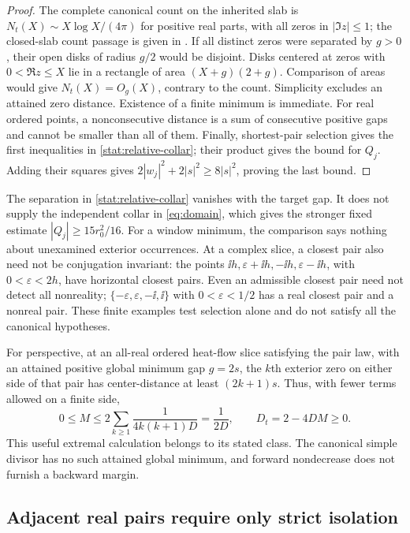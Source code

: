 \begin{proof}
The complete canonical count on the inherited slab is
$N_t(X)\sim X\log X/(4\pi)$ for positive real parts, with all zeros in
$|\Im z|\le1$; the closed-slab count passage is given in
\cite{BakerGT33}. If all distinct zeros were separated by $g>0$, their
open disks of radius $g/2$ would be disjoint. Disks centered at zeros with
$0<\Re z\le X$ lie in a rectangle of area
$(X+g)(2+g)$. Comparison of areas would give $N_t(X)=O_g(X)$,
contrary to the count. Simplicity excludes an attained zero distance.
Existence of a finite minimum is immediate. For real ordered points,
a nonconsecutive distance is a sum of consecutive positive gaps and
cannot be smaller than all of them. Finally, shortest-pair selection
gives the first inequalities in \eqref{stat:relative-collar}; their
product gives the bound for $Q_j$. Adding their squares gives
$2|w_j|^2+2|s|^2\ge8|s|^2$, proving the last bound.
\end{proof}

The separation in \eqref{stat:relative-collar} vanishes with the target
gap. It does not supply the independent collar in \eqref{eq:domain},
which gives the stronger fixed estimate $|Q_j|\ge15r_0^2/16$.
For a window minimum, the comparison says nothing about unexamined
exterior occurrences. At a complex slice, a closest pair also need not be
conjugation invariant: the points $\ii h,\varepsilon+\ii h,-\ii h,
\varepsilon-\ii h$, with $0<\varepsilon<2h$, have horizontal closest
pairs. Even an admissible closest pair need not detect all nonreality;
$\{-\varepsilon,\varepsilon,-\ii,\ii\}$ with
$0<\varepsilon<1/2$ has a real closest pair and a nonreal pair.
These finite examples test selection alone and do not satisfy all the
canonical hypotheses.

For perspective, at an all-real ordered heat-flow slice satisfying the
pair law, with an attained positive global minimum gap $g=2s$, the $k$th exterior zero on either side
of that pair has center-distance at least $(2k+1)s$. Thus, with fewer
terms allowed on a finite side,
\begin{equation}
 0\le M\le2\sum_{k\ge1}\frac1{4k(k+1)D}=\frac1{2D},
 \qquad D_t=2-4DM\ge0.
 \label{stat:telescoping}
\end{equation}
This useful extremal calculation belongs to its stated class. The
canonical simple divisor has no such attained global minimum, and
forward nondecrease does not furnish a backward margin.

\subsection{Adjacent real pairs require only strict isolation}

